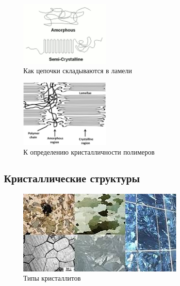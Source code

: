 \documentclass[oneside,final,14pt]{extreport}
\begin{document}
	\begin{figure} 
\vspace{-20pt}
  \begin{center}
    \includegraphics[width=0.4\textwidth]{crystal-1.png}
    \caption{Как цепочки складываются в ламели}
    \label{fig:crystal-1}
  \end{center}
  \vspace{-20pt}
  \vspace{1pt}
\end{figure}
	
	
	\begin{figure} 
\vspace{-20pt}
  \begin{center}
    \includegraphics[width=0.4\textwidth]{crystal-2.jpg}
    \caption{К определению кристалличности полимеров}
    \label{fig:crystal-2}
  \end{center}
  \vspace{-20pt}
  \vspace{1pt}
\end{figure}	
	
\subsection{Кристаллические структуры}

\begin{figure}
    \includegraphics[width=\textwidth]{crystallites.jpg}
    \caption{Типы кристаллитов}
    \label{fig:crystallites}
\end{figure}
\end{document}

